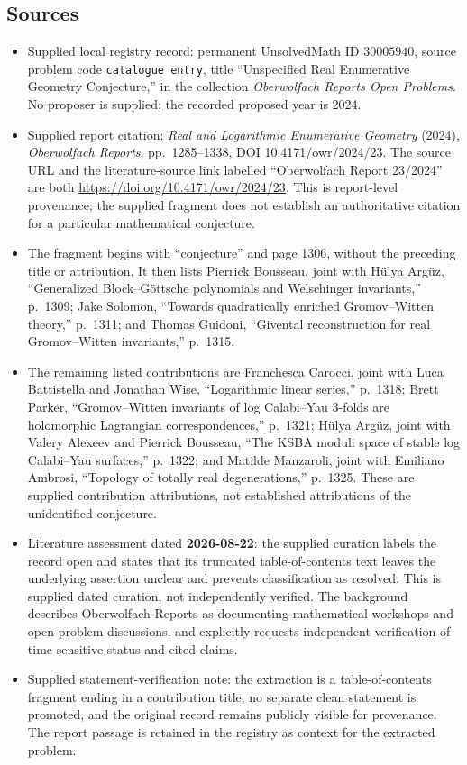 \documentclass[11pt]{article}
\begin{document}
\subsection{Sources}
\begin{itemize}
\item Supplied local registry record: permanent UnsolvedMath ID \(30005940\), source problem code \texttt{catalogue entry}, title ``Unspecified Real Enumerative Geometry Conjecture,'' in the collection \emph{Oberwolfach Reports Open Problems}. No proposer is supplied; the recorded proposed year is 2024.
\item Supplied report citation: \emph{Real and Logarithmic Enumerative Geometry} (2024), \emph{Oberwolfach Reports}, pp.\ 1285--1338, DOI 10.4171/owr/2024/23. The source URL and the literature-source link labelled ``Oberwolfach Report 23/2024'' are both \url{https://doi.org/10.4171/owr/2024/23}. This is report-level provenance; the supplied fragment does not establish an authoritative citation for a particular mathematical conjecture.
\item The fragment begins with ``conjecture'' and page 1306, without the preceding title or attribution. It then lists Pierrick Bousseau, joint with Hülya Argüz, ``Generalized Block--Göttsche polynomials and Welschinger invariants,'' p.\ 1309; Jake Solomon, ``Towards quadratically enriched Gromov--Witten theory,'' p.\ 1311; and Thomas Guidoni, ``Givental reconstruction for real Gromov--Witten invariants,'' p.\ 1315.
\item The remaining listed contributions are Franchesca Carocci, joint with Luca Battistella and Jonathan Wise, ``Logarithmic linear series,'' p.\ 1318; Brett Parker, ``Gromov--Witten invariants of log Calabi--Yau \(3\)-folds are holomorphic Lagrangian correspondences,'' p.\ 1321; Hülya Argüz, joint with Valery Alexeev and Pierrick Bousseau, ``The KSBA moduli space of stable log Calabi--Yau surfaces,'' p.\ 1322; and Matilde Manzaroli, joint with Emiliano Ambrosi, ``Topology of totally real degenerations,'' p.\ 1325. These are supplied contribution attributions, not established attributions of the unidentified conjecture.
\item Literature assessment dated \textbf{2026-08-22}: the supplied curation labels the record open and states that its truncated table-of-contents text leaves the underlying assertion unclear and prevents classification as resolved. This is supplied dated curation, not independently verified. The background describes Oberwolfach Reports as documenting mathematical workshops and open-problem discussions, and explicitly requests independent verification of time-sensitive status and cited claims.
\item Supplied statement-verification note: the extraction is a table-of-contents fragment ending in a contribution title, no separate clean statement is promoted, and the original record remains publicly visible for provenance. The report passage is retained in the registry as context for the extracted problem.
\end{itemize}
\end{document}
